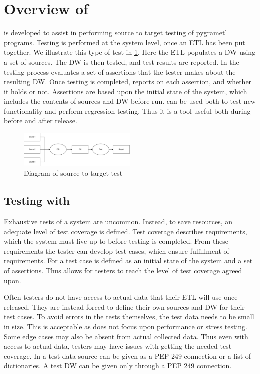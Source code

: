 \section{Overview of \FW{}}

\FW{} is developed to assist in performing source to target testing of pygrametl programs. Testing is performed at the system level, once an ETL has been put together. We illustrate this type of test in \cref{fig:sourcetotarget}. Here the ETL populates a DW using a set of sources. The DW is then tested, and test results are reported. In \FW{} the testing process evaluates a set of assertions that the tester makes about the resulting DW. Once testing is completed, \FW{} reports on each assertion, and whether it holds or not. Assertions are based upon the initial state of the system, which includes the contents of sources and DW before run. \FW{} can be used both to test new functionality and perform regression testing. Thus it is a tool useful both during before and after release. 

\begin{figure}
\centering
\includegraphics[width=0.5\textwidth]{figures/scenario.pdf}
\caption{Diagram of source to target test}
\label{fig:sourcetotarget}
\end{figure}

\subsection{Testing with \FW{}}
Exhaustive tests of a system are uncommon. Instead, to save resources, an adequate level of test coverage is defined. Test coverage describes requirements, which the system must live up to before testing is completed. From these requirements the tester can develop test cases, which ensure fulfillment of requirements. For \FW{} a test case is defined as an initial state of the system and a set of assertions. Thus \FW{} allows for testers to reach the level of test coverage agreed upon.

Often testers do not have access to actual data that their ETL will use once released. They are instead forced to define their own sources and DW  for their test cases. To avoid errors in the tests themselves, the test data needs to be small in size. This is acceptable as \FW{} does not focus upon  performance or stress testing. Some edge cases may also be absent from actual collected data. Thus even with access to actual data, testers may have issues with getting the needed test coverage. In \FW{} a test data source can be given as a  PEP 249 connection or a list of dictionaries. A test DW can be given only through a PEP 249 connection. 

